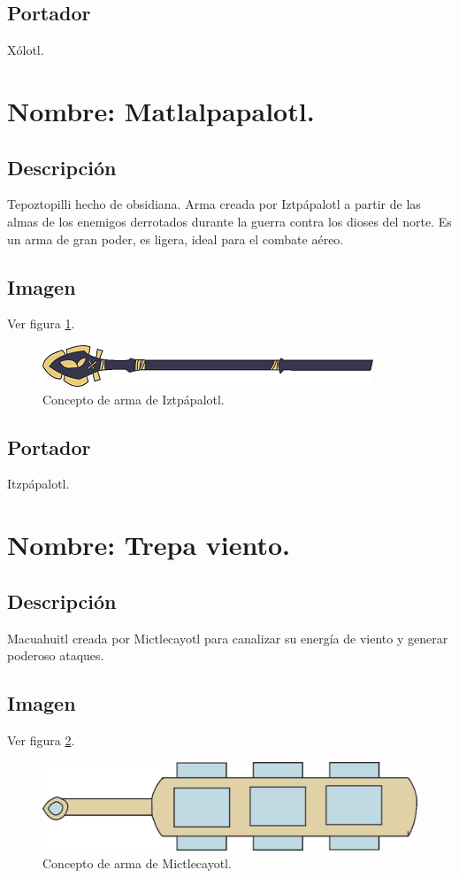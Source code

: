 	\subsection{Portador}
	Xólotl.
\section{Nombre: Matlalpapalotl.}\label{Arma:LanzaItzpapalotl}
	\subsection{Descripción}
		Tepoztopilli hecho de obsidiana. Arma creada por Iztpápalotl a partir de las almas de los enemigos derrotados durante la guerra contra los dioses del norte. Es un arma de gran poder, es ligera, ideal para el combate aéreo.
	\subsection{Imagen}
		Ver figura \ref{fig:matlalpapalotl}.
			\begin{figure}
				\centering
				\includegraphics[height=0.08 \textheight]{Imagenes/lanza02}
				\caption{Concepto de arma de Iztpápalotl.}
				\label{fig:matlalpapalotl}
			\end{figure}
	\subsection{Portador}
		Itzpápalotl.
\section{Nombre: Trepa viento.}\label{Arma:EspadaMictlecayotl}
\subsection{Descripción}
Macuahuitl creada por Mictlecayotl para canalizar su energía de viento y generar poderoso ataques.
\subsection{Imagen}
Ver figura \ref{fig:trepaViento}.
\begin{figure}
				\centering
				\includegraphics[height=0.1 \textheight]{Imagenes/espada}
				\caption{Concepto de arma de Mictlecayotl.}
				\label{fig:trepaViento}
\end{figure}
